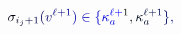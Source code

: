 \documentclass[12pt]{article}
\begin{document}
\makeatletter
\renewcommand*{\@textcolor}[3]{%
  \protect\leavevmode
  \begingroup
    \color#1{#2}#3%
  \endgroup
}
\makeatother
\begin{displaymath}
\mathcolor[RGB]{0,0,15}{\sigma} _ { \mathcolor[RGB]{0,0,30}{i} _ { \mathcolor[RGB]{0,0,45}{j} } \mathcolor[RGB]{0,0,60}{+} \mathcolor[RGB]{0,0,75}{1} } \mathcolor[RGB]{0,0,90}{(} \mathcolor[RGB]{0,0,105}{v} ^ { \mathcolor[RGB]{0,0,120}{\ell} \mathcolor[RGB]{0,0,135}{+} \mathcolor[RGB]{0,0,150}{1} } \mathcolor[RGB]{0,0,165}{)} \mathcolor[RGB]{0,0,180}{\in} \mathcolor[RGB]{0,0,195}{\{} \mathcolor[RGB]{0,0,210}{\kappa} _ { \mathcolor[RGB]{0,0,225}{a} } ^ { \mathcolor[RGB]{0,0,240}{\ell} \mathcolor[RGB]{0,0,255}{+} \mathcolor[RGB]{0,15,0}{1} } \mathcolor[RGB]{0,15,15}{,} \mathcolor[RGB]{0,15,30}{\kappa} _ { \mathcolor[RGB]{0,15,45}{a} } ^ { \mathcolor[RGB]{0,15,60}{\ell} \mathcolor[RGB]{0,15,75}{+} \mathcolor[RGB]{0,15,90}{1} } \mathcolor[RGB]{0,15,105}{\}} \mathcolor[RGB]{0,15,120}{,}
\end{displaymath}
\end{document}
